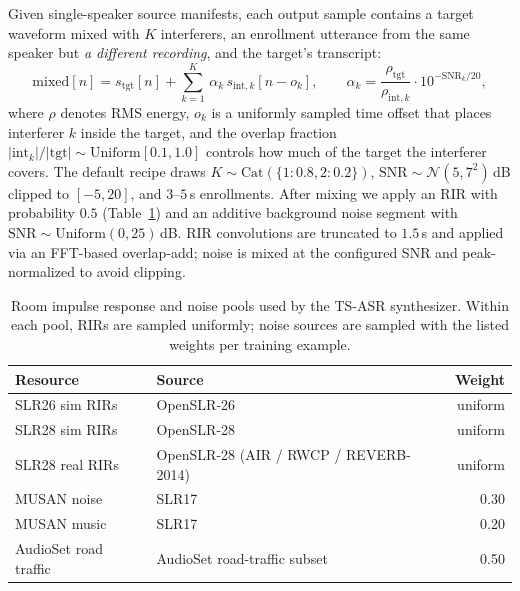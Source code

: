 Given single-speaker source manifests, each output sample contains a
target waveform mixed with $K$ interferers, an enrollment utterance
from the same speaker but \emph{a different recording}, and the
target's transcript:
\begin{equation}
  \mathrm{mixed}[n] = s_\text{tgt}[n] + \sum_{k=1}^{K}\,\alpha_k\,s_{\text{int},k}[n - o_k],
  \qquad
  \alpha_k = \frac{\rho_\text{tgt}}{\rho_{\text{int},k}}\cdot 10^{-\mathrm{SNR}_k/20},
  \label{eq:mixspeakers}
\end{equation}
where $\rho$ denotes RMS energy, $o_k$ is a uniformly sampled time
offset that places interferer $k$ inside the target, and the overlap
fraction $|\text{int}_k|/|\text{tgt}|\!\sim\!\mathrm{Uniform}[0.1, 1.0]$
controls how much of the target the interferer covers.
The default recipe draws
$K\!\sim\!\mathrm{Cat}(\{1{:}0.8, 2{:}0.2\})$,
$\mathrm{SNR}\!\sim\!\mathcal{N}(5, 7^2)$\,dB clipped to $[-5, 20]$,
and $3$--$5$\,s enrollments.
After mixing we apply an RIR with probability $0.5$
(Table~\ref{tab:data_rir_noise}) and an additive background noise
segment with $\mathrm{SNR}\!\sim\!\mathrm{Uniform}(0, 25)$\,dB.
RIR convolutions are truncated to $1.5$\,s and applied via an
FFT-based overlap-add; noise is mixed at the configured SNR and
peak-normalized to avoid clipping.

\begin{table}[!htbp]
  \caption{Room impulse response and noise pools used by the TS-ASR
    synthesizer. Within each pool, RIRs are sampled uniformly; noise
    sources are sampled with the listed weights per training example.}
  \label{tab:data_rir_noise}
  \centering
  \small
  \begin{tabular}{p{4.0cm}p{6.0cm}r}
    \toprule
    Resource & Source & Weight \\
    \midrule
    SLR26 sim RIRs       & OpenSLR-26 \cite{ko2017studyrir}                            & uniform \\
    SLR28 sim RIRs       & OpenSLR-28 \cite{ko2017studyrir}                            & uniform \\
    SLR28 real RIRs      & OpenSLR-28 (AIR / RWCP / REVERB-2014) \cite{ko2017studyrir} & uniform \\
    \midrule
    MUSAN noise          & SLR17 \cite{snyder2015musan}                                & 0.30 \\
    MUSAN music          & SLR17 \cite{snyder2015musan}                                & 0.20 \\
    AudioSet road traffic & AudioSet road-traffic subset                               & 0.50 \\
    \bottomrule
  \end{tabular}
\end{table}

